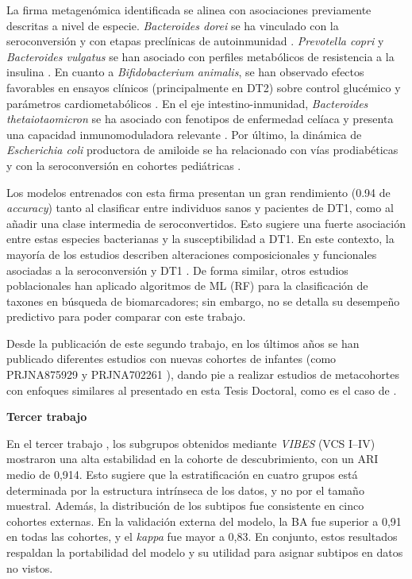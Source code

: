 La firma metagenómica identificada se alinea con asociaciones previamente descritas a nivel de especie. \textit{Bacteroides dorei} se ha vinculado con la seroconversión y con etapas preclínicas de autoinmunidad \cite{davis2014bacteroides}. \textit{Prevotella copri} y \textit{Bacteroides vulgatus} se han asociado con perfiles metabólicos de resistencia a la insulina \cite{pedersen2016human}. En cuanto a \textit{Bifidobacterium animalis}, se han observado efectos favorables en ensayos clínicos (principalmente en DT2) sobre control glucémico y parámetros cardiometabólicos \cite{stenman2016probiotic, khiaolaongam2025bifidobacterium}. En el eje intestino-inmunidad, \textit{Bacteroides thetaiotaomicron} se ha asociado con fenotipos de enfermedad celíaca y presenta una capacidad inmunomoduladora relevante \cite{sanchez2010intestinal}. Por último, la dinámica de \textit{Escherichia coli} productora de amiloide se ha relacionado con vías prodiabéticas y con la seroconversión en cohortes pediátricas \cite{tetz2019type}.

Los modelos entrenados con esta firma presentan un gran rendimiento (0.94 de \textit{accuracy}) tanto al clasificar entre individuos sanos y pacientes de DT1, como al añadir una clase intermedia de seroconvertidos. Esto sugiere una fuerte asociación entre estas especies bacterianas y la susceptibilidad a DT1. En este contexto, la mayoría de los estudios describen alteraciones composicionales y funcionales asociadas a la seroconversión y DT1 \cite{vatanen2018human, kostic2015dynamics}. De forma similar, otros estudios poblacionales \cite{belteky2023infant} han aplicado algoritmos de ML (RF) para la clasificación de taxones en búsqueda de biomarcadores; sin embargo, no se detalla su desempeño predictivo para poder comparar con este trabajo.

Desde la publicación de este segundo trabajo, en los últimos años se han publicado diferentes estudios con nuevas cohortes de infantes (como PRJNA875929 \cite{belteky2023infant} y PRJNA702261 \cite{del2022gut}), dando pie a realizar estudios de metacohortes con enfoques similares al presentado en esta Tesis Doctoral, como es el caso de \cite{liu2024predicting}.


\textbf{Tercer trabajo}


En el tercer trabajo \cite{paper3}, los subgrupos obtenidos mediante \textit{VIBES} (VCS I–IV) mostraron una alta estabilidad en la cohorte de descubrimiento, con un ARI medio de 0,914. Esto sugiere que la estratificación en cuatro grupos está determinada por la estructura intrínseca de los datos, y no por el tamaño muestral. Además, la distribución de los subtipos fue consistente en cinco cohortes externas. En la validación externa del modelo, la BA fue superior a 0,91 en todas las cohortes, y el \textit{kappa} fue mayor a 0,83. En conjunto, estos resultados respaldan la portabilidad del modelo y su utilidad para asignar subtipos en datos no vistos.

